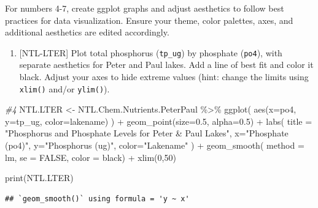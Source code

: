 \documentclass[
]{article}
\newenvironment{Shaded}{\begin{snugshade}}{\end{snugshade}}
\newcommand{\AttributeTok}[1]{\textcolor[rgb]{0.77,0.63,0.00}{#1}}
\newcommand{\CommentTok}[1]{\textcolor[rgb]{0.56,0.35,0.01}{\textit{#1}}}
\newcommand{\ConstantTok}[1]{\textcolor[rgb]{0.00,0.00,0.00}{#1}}
\newcommand{\DecValTok}[1]{\textcolor[rgb]{0.00,0.00,0.81}{#1}}
\newcommand{\FloatTok}[1]{\textcolor[rgb]{0.00,0.00,0.81}{#1}}
\newcommand{\FunctionTok}[1]{\textcolor[rgb]{0.00,0.00,0.00}{#1}}
\newcommand{\NormalTok}[1]{#1}
\newcommand{\OtherTok}[1]{\textcolor[rgb]{0.56,0.35,0.01}{#1}}
\newcommand{\SpecialCharTok}[1]{\textcolor[rgb]{0.00,0.00,0.00}{#1}}
\newcommand{\StringTok}[1]{\textcolor[rgb]{0.31,0.60,0.02}{#1}}
\providecommand{\tightlist}{%
  \setlength{\itemsep}{0pt}\setlength{\parskip}{0pt}}
\begin{document}
For numbers 4-7, create ggplot graphs and adjust aesthetics to follow
best practices for data visualization. Ensure your theme, color
palettes, axes, and additional aesthetics are edited accordingly.

\begin{enumerate}
\def\labelenumi{\arabic{enumi}.}
\setcounter{enumi}{3}
\tightlist
\item
  {[}NTL-LTER{]} Plot total phosphorus (\texttt{tp\_ug}) by phosphate
  (\texttt{po4}), with separate aesthetics for Peter and Paul lakes. Add
  a line of best fit and color it black. Adjust your axes to hide
  extreme values (hint: change the limits using \texttt{xlim()} and/or
  \texttt{ylim()}).
\end{enumerate}

\begin{Shaded}
\begin{Highlighting}[]
\CommentTok{\#4 }
\NormalTok{NTL.LTER }\OtherTok{\textless{}{-}}\NormalTok{ NTL.Chem.Nutrients.PeterPaul }\SpecialCharTok{\%\textgreater{}\%}
  \FunctionTok{ggplot}\NormalTok{(}
    \FunctionTok{aes}\NormalTok{(}\AttributeTok{x=}\NormalTok{po4,}
      \AttributeTok{y=}\NormalTok{tp\_ug,}
      \AttributeTok{color=}\NormalTok{lakename)}
\NormalTok{    ) }\SpecialCharTok{+} 
  \FunctionTok{geom\_point}\NormalTok{(}\AttributeTok{size=}\FloatTok{0.5}\NormalTok{, }\AttributeTok{alpha=}\FloatTok{0.5}\NormalTok{) }\SpecialCharTok{+}
    \FunctionTok{labs}\NormalTok{(}
      \AttributeTok{title =} \StringTok{"Phosphorus and Phosphate Levels for Peter \& Paul Lakes"}\NormalTok{,}
      \AttributeTok{x=}\StringTok{"Phosphate (po4)"}\NormalTok{,}
      \AttributeTok{y=}\StringTok{"Phosphorus (ug)"}\NormalTok{, }
      \AttributeTok{color=}\StringTok{"Lakename"}
\NormalTok{    ) }\SpecialCharTok{+}
  \FunctionTok{geom\_smooth}\NormalTok{(}
    \AttributeTok{method =} \StringTok{\textquotesingle{}lm\textquotesingle{}}\NormalTok{,}
    \AttributeTok{se =} \ConstantTok{FALSE}\NormalTok{,}
    \AttributeTok{color =} \StringTok{\textquotesingle{}black\textquotesingle{}}\NormalTok{) }\SpecialCharTok{+}
    \FunctionTok{xlim}\NormalTok{(}\DecValTok{0}\NormalTok{,}\DecValTok{50}\NormalTok{)}

\FunctionTok{print}\NormalTok{(NTL.LTER)}
\end{Highlighting}
\end{Shaded}

\begin{verbatim}
## `geom_smooth()` using formula = 'y ~ x'
\end{verbatim}
\end{document}
